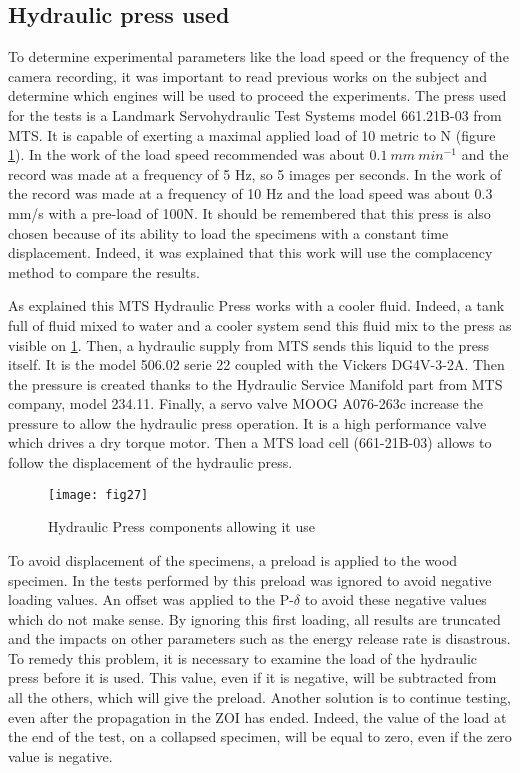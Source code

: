 \subsection{Hydraulic press used}

To determine experimental parameters like the load speed or the frequency of the camera recording, it was important to read previous works on the subject and determine which engines will be used to proceed the experiments. The press used for the tests is a Landmark Servohydraulic Test Systems model 661.21B-03  from MTS. It is capable of exerting a maximal applied load of 10 metric to N (figure \ref{fig:fig27}).
In the work of \cite{Ostapska2021} the load speed recommended was about $0.1\ mm\ {min}^{-1}$ and the record was made at a frequency of 5 Hz, so 5 images per seconds. In the work of \cite{Mambili2018} the record was made at a frequency of 10 Hz and the load speed was about 0.3 mm/s with a pre-load of 100N. It should be remembered that this press is also chosen because of its ability to load the specimens with a constant time displacement. Indeed, it was explained that this work will use the complacency method to compare the results.

As explained \cite{MALFAIT2021}  this MTS Hydraulic Press works with a cooler fluid. Indeed, a tank full of fluid mixed to water and a cooler system send this fluid mix to the press as visible on \ref{fig:fig27}. Then, a hydraulic supply from MTS sends this liquid to the press itself. It is the model 506.02 serie 22 coupled with the Vickers DG4V-3-2A. Then the pressure is created thanks to the Hydraulic Service Manifold part from MTS company, model 234.11. Finally, a servo valve MOOG A076-263c increase the pressure to allow the hydraulic press operation. It is a high performance valve which drives a dry torque motor. Then a MTS load cell (661-21B-03) allows to follow the displacement of the hydraulic press.


\begin{figure}[htp]
	\centering
	\texttt{[image: fig27]}
	\caption{Hydraulic Press components allowing it use \cite{MALFAIT2021}}
	\label{fig:fig27}
\end{figure}

To avoid displacement of the specimens, a preload is applied to the wood specimen. In the tests performed by \cite{MALFAIT2021} this preload was ignored to avoid negative loading values. An offset was applied to the P-$\delta$ to avoid these negative values which do not make sense. By ignoring this first loading, all results are truncated and the impacts on other parameters such as the energy release rate is disastrous. 
To remedy this problem, it is necessary to examine the load of the hydraulic press before it is used. This value, even if it is negative, will be subtracted from all the others, which will give the preload. Another solution is to continue testing, even after the propagation in the ZOI has ended. Indeed, the value of the load at the end of the test, on a collapsed specimen, will be equal to zero, even if the zero value is negative.

